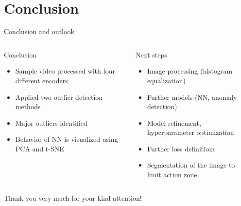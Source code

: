 \documentclass[aspectratio=169]{beamer}
\begin{document}
\section{Conclusion}
\begin{frame}{Conclusion and outlook}
    \begin{columns}[t]
        \begin{column}{0.45\textwidth}
            Conclusion
            \begin{itemize}
                \item Sample video processed with four different encoders
                \item Applied two outlier detection methods
                \item Major outliers identified
                \item Behavior of NN is visualized using PCA and t-SNE
            \end{itemize}
        \end{column}
        \begin{column}{0.45\textwidth}
            Next steps
            \begin{itemize}
                \item Image processing (histogram equalization)
                \item Further models (NN, anomaly detection)
                \item Model refinement, hyperparameter optimization
                \item Further loss definitions
                \item Segmentation of the image to limit action zone
            \end{itemize}
        \end{column}
    \end{columns}
\end{frame}

\begin{frame}
    \thispagestyle{empty}
    \centering \Large
    Thank you very much for your kind attention!
\end{frame}
\end{document}

